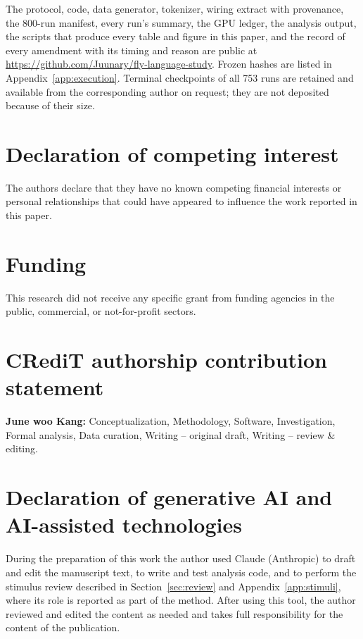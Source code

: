 \documentclass[preprint,12pt,authoryear]{elsarticle}
\begin{document}
The protocol, code, data generator, tokenizer, wiring extract with provenance, the 800-run manifest, every run's summary, the GPU ledger, the analysis output, the scripts that produce every table and figure in this paper, and the record of every amendment with its timing and reason are public at \url{https://github.com/Juunary/fly-language-study}. Frozen hashes are listed in Appendix~\ref{app:execution}. Terminal checkpoints of all 753 runs are retained and available from the corresponding author on request; they are not deposited because of their size.

\section*{Declaration of competing interest}

The authors declare that they have no known competing financial interests or personal relationships that could have appeared to influence the work reported in this paper.

\section*{Funding}

This research did not receive any specific grant from funding agencies in the public, commercial, or not-for-profit sectors.

\section*{CRediT authorship contribution statement}

\textbf{June woo Kang:} Conceptualization, Methodology, Software, Investigation, Formal analysis, Data curation, Writing -- original draft, Writing -- review \& editing.

\section*{Declaration of generative AI and AI-assisted technologies}

During the preparation of this work the author used Claude (Anthropic) to draft and edit the manuscript text, to write and test analysis code, and to perform the stimulus review described in Section~\ref{sec:review} and Appendix~\ref{app:stimuli}, where its role is reported as part of the method. After using this tool, the author reviewed and edited the content as needed and takes full responsibility for the content of the publication.
\end{document}
